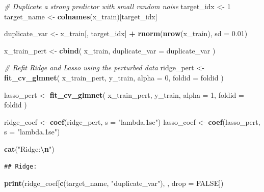 \documentclass[
  11pt,
]{article}
\newenvironment{Shaded}{\begin{snugshade}}{\end{snugshade}}
\newcommand{\AttributeTok}[1]{\textcolor[rgb]{0.13,0.29,0.53}{#1}}
\newcommand{\CommentTok}[1]{\textcolor[rgb]{0.56,0.35,0.01}{\textit{#1}}}
\newcommand{\ConstantTok}[1]{\textcolor[rgb]{0.56,0.35,0.01}{#1}}
\newcommand{\DecValTok}[1]{\textcolor[rgb]{0.00,0.00,0.81}{#1}}
\newcommand{\FloatTok}[1]{\textcolor[rgb]{0.00,0.00,0.81}{#1}}
\newcommand{\FunctionTok}[1]{\textcolor[rgb]{0.13,0.29,0.53}{\textbf{#1}}}
\newcommand{\NormalTok}[1]{#1}
\newcommand{\OtherTok}[1]{\textcolor[rgb]{0.56,0.35,0.01}{#1}}
\newcommand{\SpecialCharTok}[1]{\textcolor[rgb]{0.81,0.36,0.00}{\textbf{#1}}}
\newcommand{\StringTok}[1]{\textcolor[rgb]{0.31,0.60,0.02}{#1}}
\begin{document}
\begin{Shaded}
\begin{Highlighting}[]
\CommentTok{\# Duplicate a strong predictor with small random noise}
\NormalTok{target\_idx }\OtherTok{\textless{}{-}} \DecValTok{1}
\NormalTok{target\_name }\OtherTok{\textless{}{-}} \FunctionTok{colnames}\NormalTok{(x\_train)[target\_idx]}

\NormalTok{duplicate\_var }\OtherTok{\textless{}{-}}\NormalTok{ x\_train[, target\_idx] }\SpecialCharTok{+}
  \FunctionTok{rnorm}\NormalTok{(}\FunctionTok{nrow}\NormalTok{(x\_train), }\AttributeTok{sd =} \FloatTok{0.01}\NormalTok{)}

\NormalTok{x\_train\_pert }\OtherTok{\textless{}{-}} \FunctionTok{cbind}\NormalTok{(}
\NormalTok{  x\_train,}
  \AttributeTok{duplicate\_var =}\NormalTok{ duplicate\_var}
\NormalTok{)}

\CommentTok{\# Refit Ridge and Lasso using the perturbed data}
\NormalTok{ridge\_pert }\OtherTok{\textless{}{-}} \FunctionTok{fit\_cv\_glmnet}\NormalTok{(}
\NormalTok{  x\_train\_pert,}
\NormalTok{  y\_train,}
  \AttributeTok{alpha =} \DecValTok{0}\NormalTok{,}
  \AttributeTok{foldid =}\NormalTok{ foldid}
\NormalTok{)}

\NormalTok{lasso\_pert }\OtherTok{\textless{}{-}} \FunctionTok{fit\_cv\_glmnet}\NormalTok{(}
\NormalTok{  x\_train\_pert,}
\NormalTok{  y\_train,}
  \AttributeTok{alpha =} \DecValTok{1}\NormalTok{,}
  \AttributeTok{foldid =}\NormalTok{ foldid}
\NormalTok{)}

\NormalTok{ridge\_coef }\OtherTok{\textless{}{-}} \FunctionTok{coef}\NormalTok{(ridge\_pert, }\AttributeTok{s =} \StringTok{"lambda.1se"}\NormalTok{)}
\NormalTok{lasso\_coef }\OtherTok{\textless{}{-}} \FunctionTok{coef}\NormalTok{(lasso\_pert, }\AttributeTok{s =} \StringTok{"lambda.1se"}\NormalTok{)}

\FunctionTok{cat}\NormalTok{(}\StringTok{"Ridge:}\SpecialCharTok{\textbackslash{}n}\StringTok{"}\NormalTok{)}
\end{Highlighting}
\end{Shaded}

\begin{verbatim}
## Ridge:
\end{verbatim}

\begin{Shaded}
\begin{Highlighting}[]
\FunctionTok{print}\NormalTok{(ridge\_coef[}\FunctionTok{c}\NormalTok{(target\_name, }\StringTok{"duplicate\_var"}\NormalTok{), , }\AttributeTok{drop =} \ConstantTok{FALSE}\NormalTok{])}
\end{Highlighting}
\end{Shaded}
\end{document}
